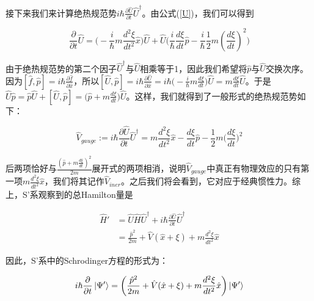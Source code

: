 \documentclass[a4paper]{article}
\begin{document}
        接下来我们来计算绝热规范势$i\hbar\frac{\partial\hat{U}}{\partial t}\hat{U}^\dagger$。由公式(\ref{U})，我们可以得到

        \begin{equation}
            \frac{\partial}{\partial t}\hat{U} = \big(-\frac{i}{\hbar}m\frac{d^2 \xi}{dt^2} \hat{x}\big)\hat{U} + \hat{U}\big(\frac{i}{\hbar}\frac{d\xi}{dt}\hat{p} - \frac{i}{\hbar}\frac{1}{2}m(\frac{d\xi}{dt})^2\big)
        \end{equation}
        
        由于绝热规范势的第二个因子$\hat{U}^\dagger$与$\hat{U}$相乘等于1，因此我们希望将$\hat{p}$与$\hat{U}$交换次序。因为$[\hat{f}, \hat{p}]=i\hbar\frac{\partial\hat{f}}{\partial\hat{x}}$，所以$[\hat{U}, \hat{p}] = i\hbar\frac{\partial\hat{U}}{\partial\hat{x}} = i\hbar\big(-\frac{i}{\hbar}m\frac{d\xi}{dt}\big)\hat{U} = m\frac{d\xi}{dt}\hat{U}$。于是$\hat{U}\hat{p} = \hat{p}\hat{U} + [\hat{U}, \hat{p}] = \big(\hat{p}+m\frac{d\xi}{dt}\big)\hat{U}$。这样，我们就得到了一般形式的绝热规范势如下：

        \begin{equation}
            \hat{V}_{gauge} := i\hbar\frac{\partial\hat{U}}{\partial t}\hat{U}^\dagger = m \frac{d^2\xi}{d t^2}\hat{x}-\frac{d\xi}{dt}\hat{p}-\frac{1}{2}m\bigg(\frac{d\xi}{dt}\bigg)^2
        \end{equation}

        后两项恰好与$\frac{(\hat{p}+m\frac{d\xi}{dt})^2}{2m}$展开式的两项相消，说明$\hat{V}_{gauge}$中真正有物理效应的只有第一项$m\frac{d^2\xi}{d t^2}\hat{x}$，我们将其记作$\hat{V}_{iner}$。之后我们将会看到，它对应于经典惯性力。综上，S'系观察到的总Hamilton量是

        \begin{equation}\label{H-eff}
            \begin{split}
                \hat{H}'&= \hat{U}\hat{H}\hat{U}^\dagger+i\hbar\frac{\partial\hat{U}}{\partial t}\hat{U}^\dagger \\
                    &= \frac{\hat{p}^2}{2m}+\hat{V}(\hat{x}+\xi)+m\frac{d^2\xi}{d t^2}\hat{x}
            \end{split}
        \end{equation}

        因此，S'系中的Schrodinger方程的形式为：

        \begin{equation}
            i\hbar\frac{\partial}{\partial t}\ket{\Psi'} = \biggl(\frac{\hat{p}^2}{2m}+\hat{V}(\hat{x}+\xi)+m\frac{d^2\xi}{d t^2}\hat{x}\biggr) \ket{\Psi'}
        \end{equation}
\end{document}
